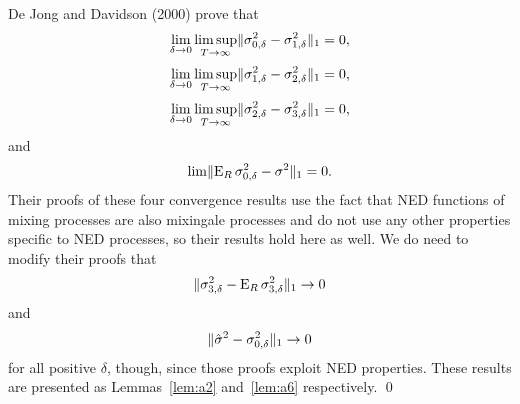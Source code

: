 \documentclass[12pt,draft]{article}
\begin{document}
De Jong and Davidson (2000) prove that
\begin{equation*}
\lim_{\delta\to0} \limsup_{T\to\infty} \lVert \sigma_{0,\delta}^2 -
\sigma_{1,\delta}^2\rVert_1 = 0,
\end{equation*}
\begin{equation*}
\lim_{\delta\to0} \limsup_{T\to\infty} \lVert \sigma_{1,\delta}^2 - \sigma_{2,\delta}^{2}
\rVert_1 = 0,
\end{equation*}
\begin{equation*}
\lim_{\delta\to0} \limsup_{T\to\infty} \lVert \sigma_{2,\delta}^{2} - \sigma_{3,\delta}^{2}
\rVert_1 = 0,
\end{equation*}
and
\begin{equation*}
\lim \lVert \operatorname{E}_R \sigma_{0,\delta}^2 - \sigma^2 \rVert_1 = 0.
\end{equation*}
Their proofs of these four convergence results use the fact that NED
functions of mixing processes are also mixingale processes and do not
use any other properties specific to NED processes, so their results
hold here as well.  We do need to modify their proofs that
\begin{equation*}
  \lVert \sigma_{3,\delta}^{2} - \operatorname{E}_R \sigma_{3,\delta}^{2} \rVert_1 \to 0
\end{equation*}
and
\begin{equation*}
  \lVert \hat{\sigma}^2 - \sigma_{0,\delta}^2 \rVert_1 \to 0
\end{equation*}
for all positive $\delta$, though, since those proofs exploit NED
properties. These results are presented as Lemmas~\ref{lem:a2}
and~\ref{lem:a6} respectively.  \qed
\end{document}

